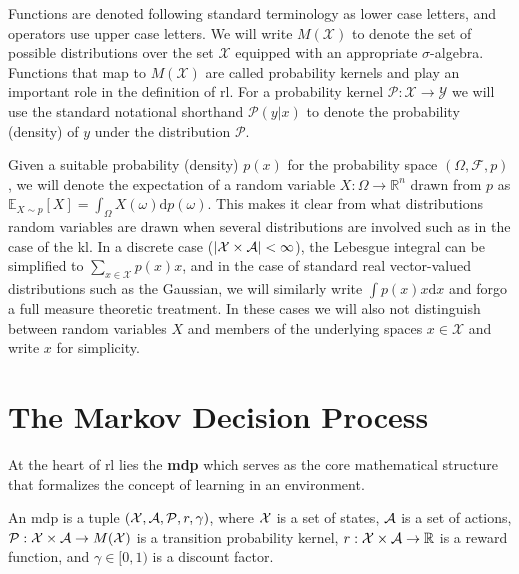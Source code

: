 Functions are denoted following standard terminology as lower case letters, and operators use upper case letters.
We will write $M(\mathcal{X})$ to denote the set of possible distributions over the set $\mathcal{X}$ equipped with an appropriate $\sigma$-algebra.
Functions that map to $M(\mathcal{X})$ are called probability kernels and play an important role in the definition of \ac{rl}.
For a probability kernel $\mathcal{P}: \mathcal{X} \rightarrow \mathcal{Y}$ we will use the standard notational shorthand $\mathcal{P}(y|x)$ to denote the probability (density) of $y$ under the distribution $\mathcal{P}$.

Given a suitable probability (density) $p(x)$ for the probability space $(\Omega,\mathcal{F},p)$, we will denote the expectation of a random variable $X: \Omega \rightarrow \mathbb{R}^n$ drawn from $p$ as $\mathbb{E}_{X \sim p}\left[X\right] = \int_{\Omega} X(\omega) \mathrm{d} p(\omega)$.
This makes it clear from what distributions random variables are drawn when several distributions are involved such as in the case of the \ac{kl}.
In a discrete case ($|\mathcal{X} \times \mathcal{A}| < \infty$), the Lebesgue integral can be simplified to $\sum_{x \in \mathcal{X}} p(x) x$, and in the case of standard real vector-valued distributions such as the Gaussian, we will similarly write $\int p(x) x \mathrm{d} x$ and forgo a full measure theoretic treatment.
In these cases we will also not distinguish between random variables $X$ and members of the underlying spaces $x \in \mathcal{X}$ and write $x$ for simplicity.


\section{The Markov Decision Process}
\label{chap:background:mdp}

At the heart of \ac{rl} lies the \textbf{\ac{mdp}} which serves as the core mathematical structure that formalizes the concept of learning in an environment.


\begin{definition}
An {\ac{mdp}} is a tuple $(\mathcal{X},\mathcal{A},\mathcal{P},r,\gamma)$, where $\mathcal{X}$ is a set of states, $\mathcal{A}$ is a set of actions, $\mathcal{P}: \mathcal{X} \times \mathcal{A} \rightarrow M(\mathcal{X})$ is a transition probability kernel, $r: \mathcal{X} \times \mathcal{A} \rightarrow \mathbb{R}$ is a reward function, and $\gamma \in [0,1)$ is a discount factor.
\end{definition}

